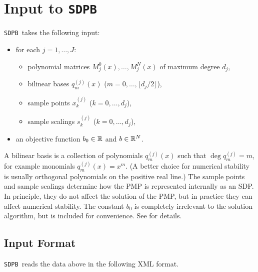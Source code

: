\documentclass[12pt]{article}
\numberwithin{equation}{section}
\newcommand\SDPB{\texttt{SDPB}}
\begin{document}
\section{Input to \SDPB}

\SDPB\ takes the following input:
\begin{itemize}
\item for each $j=1,\dots,J$:
\begin{itemize}
\item polynomial matrices $M^0_j(x),\dots,M^N_j(x)$ of maximum degree $d_j$,
\item bilinear bases $q_m^{(j)}(x)$ ($m=0,\dots,\lfloor d_j/2\rfloor$),
\item sample points $x_k^{(j)}$ ($k=0,\dots,d_j$),
\item sample scalings $s_k^{(j)}$ ($k=0,\dots,d_j$),
\end{itemize}
\item an objective function $b_0\in \mathbb{R}$ and $b\in \mathbb{R}^N$.
\end{itemize}
A bilinear basis is a collection of polynomials $q_m^{(j)}(x)$ such that $\deg q_m^{(j)} = m$, for example monomials $q_m^{(j)}(x)=x^m$.  (A better choice for numerical stability is usually orthogonal polynomials on the positive real line.)  The sample points and sample scalings determine how the PMP is represented internally as an SDP.  In principle, they do not affect the solution of the PMP, but in practice they can affect numerical stability.  The constant $b_0$ is completely irrelevant to the solution algorithm, but is included for convenience.  See \cite{DSD} for details.

\subsection{Input Format}

\SDPB\ reads the data above in the following XML format.
\end{document}
